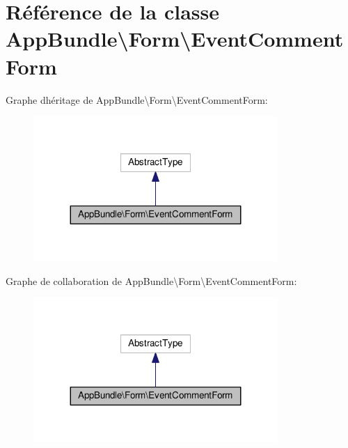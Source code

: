 \hypertarget{classAppBundle_1_1Form_1_1EventCommentForm}{}\section{Référence de la classe App\+Bundle\textbackslash{}Form\textbackslash{}Event\+Comment\+Form}
\label{classAppBundle_1_1Form_1_1EventCommentForm}


Graphe d\textquotesingle{}héritage de App\+Bundle\textbackslash{}Form\textbackslash{}Event\+Comment\+Form\+:\nopagebreak
\begin{figure}[H]
\begin{center}
\leavevmode
\includegraphics[width=263pt]{classAppBundle_1_1Form_1_1EventCommentForm__inherit__graph}
\end{center}
\end{figure}


Graphe de collaboration de App\+Bundle\textbackslash{}Form\textbackslash{}Event\+Comment\+Form\+:\nopagebreak
\begin{figure}[H]
\begin{center}
\leavevmode
\includegraphics[width=263pt]{classAppBundle_1_1Form_1_1EventCommentForm__coll__graph}
\end{center}
\end{figure}
